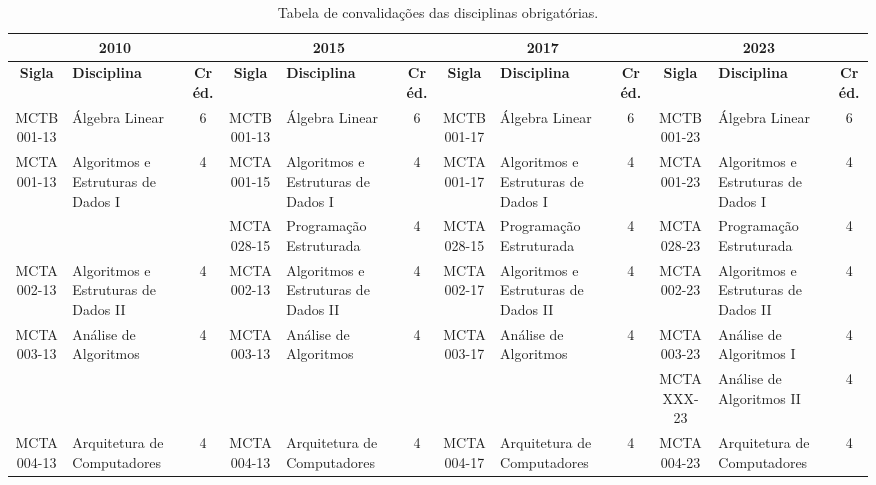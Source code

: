 \begin{landscape}
{\footnotesize
\begin{longtable}{|c|p{.2\textheight}|c||c|p{.2\textheight}|c||c|p{.2\textheight}|c||c|p{.2\textheight}|c|}
    \caption{Tabela de convalidações das disciplinas obrigatórias.}
    \label{tab:convalidacoes_obrigatorias} \\

    \hline
    \multicolumn{3}{|c||}{\bf 2010} & \multicolumn{3}{|c|}{\bf 2015} &
    \multicolumn{3}{|c||}{\bf 2017} & \multicolumn{3}{|c|}{\bf 2023} \\ 
    \hline
    
    \textbf{Sigla} & \textbf{Disciplina} & \textbf{Créd.} & \textbf{Sigla} & \textbf{Disciplina} & \textbf{Créd.} &
    \textbf{Sigla} & \textbf{Disciplina} & \textbf{Créd.} & \textbf{Sigla} & \textbf{Disciplina} & \textbf{Créd.} \\
    \hline\hline
    
    MCTB001-13 & Álgebra Linear & 6 &
    MCTB001-13 & Álgebra Linear & 6 &
    MCTB001-17 & Álgebra Linear & 6 &
    MCTB001-23 & Álgebra Linear & 6 \\ \hline

    MCTA001-13 & Algoritmos e Estruturas de Dados I & 4 &
    MCTA001-15 & Algoritmos e Estruturas de Dados I & 4 & 
    MCTA001-17 & Algoritmos e Estruturas de Dados I & 4 & 
    MCTA001-23 & Algoritmos e Estruturas de Dados I & 4 \\

    & & &
    MCTA028-15 & Programação Estruturada & 4 &
    MCTA028-15 & Programação Estruturada & 4 &
    MCTA028-23 & Programação Estruturada & 4 \\ \hline

    MCTA002-13 & Algoritmos e Estruturas de Dados II & 4 &
    MCTA002-13 & Algoritmos e Estruturas de Dados II & 4 & 
    MCTA002-17 & Algoritmos e Estruturas de Dados II & 4 & 
    MCTA002-23 & Algoritmos e Estruturas de Dados II & 4 \\ \hline

    MCTA003-13 & Análise de Algoritmos & 4 &
    MCTA003-13 & Análise de Algoritmos & 4 &
    MCTA003-17 & Análise de Algoritmos & 4 & 
    MCTA003-23 & Análise de Algoritmos I & 4 \\

    & & &
    & & &
    & & &
    MCTAXXX-23 & Análise de Algoritmos II & 4 \\ \hline

    MCTA004-13 & Arquitetura de Computadores & 4 &
    MCTA004-13 & Arquitetura de Computadores & 4 &
    MCTA004-17 & Arquitetura de Computadores & 4 &
    MCTA004-23 & Arquitetura de Computadores & 4 \\ \hline


\end{longtable}}
\end{landscape}

